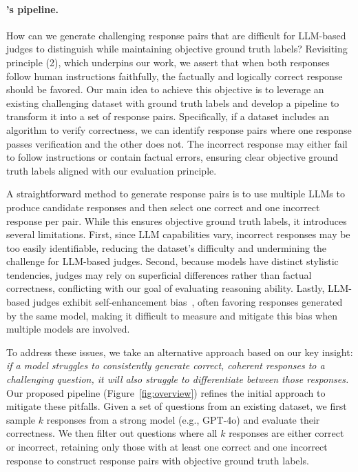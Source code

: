 \documentclass{article} %
\begin{document}
\paragraph{\sys's pipeline.} 
How can we generate challenging response pairs that are difficult for LLM-based judges to distinguish while maintaining objective ground truth labels? Revisiting principle (2), which underpins our work, we assert that when both responses follow human instructions faithfully, the factually and logically correct response should be favored. Our main idea to achieve this objective is to leverage an existing challenging dataset with ground truth labels and develop a pipeline to transform it into a set of response pairs. Specifically, if a dataset includes an algorithm to verify correctness, we can identify response pairs where one response passes verification and the other does not. The incorrect response may either fail to follow instructions or contain factual errors, ensuring clear objective ground truth labels aligned with our evaluation principle.

A straightforward method to generate response pairs is to use multiple LLMs to produce candidate responses and then select one correct and one incorrect response per pair. While this ensures objective ground truth labels, it introduces several limitations. First, since LLM capabilities vary, incorrect responses may be too easily identifiable, reducing the dataset's difficulty and undermining the challenge for LLM-based judges. Second, because models have distinct stylistic tendencies, judges may rely on superficial differences rather than factual correctness, conflicting with our goal of evaluating reasoning ability. Lastly, LLM-based judges exhibit self-enhancement bias~\citep{zheng2024judging}, often favoring responses generated by the same model, making it difficult to measure and mitigate this bias when multiple models are involved.

To address these issues, we take an alternative approach based on our key insight: \textit{if a model struggles to consistently generate correct, coherent responses to a challenging question, it will also struggle to differentiate between those responses.} Our proposed pipeline (Figure~\ref{fig:overview}) refines the initial approach to mitigate these pitfalls. Given a set of questions from an existing dataset, we first sample $k$ responses from a strong model (e.g., GPT-4o) and evaluate their correctness. We then filter out questions where all $k$ responses are either correct or incorrect, retaining only those with at least one correct and one incorrect response to construct response pairs with objective ground truth labels.
\end{document}
